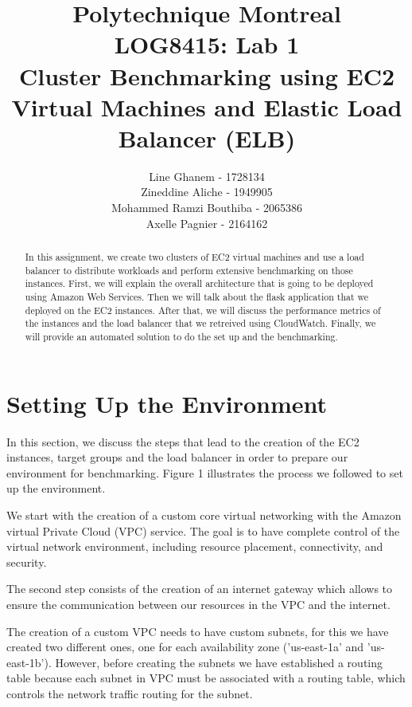 \documentclass[12pt]{article}
\title{Polytechnique Montreal \\
LOG8415: Lab 1\\
Cluster Benchmarking using EC2 Virtual
Machines and Elastic Load Balancer (ELB)}
\author{Line Ghanem - 1728134\\Zineddine Aliche - 1949905\\
Mohammed Ramzi Bouthiba - 2065386\\Axelle Pagnier - 2164162}
\begin{document}
\maketitle

\begin{abstract}
In this	assignment,	we	create	two	clusters of	EC2 virtual	machines and use	a load	balancer	to	distribute	workloads	and	perform	extensive	benchmarking	on	those instances.\newline
First, we will explain the overall architecture that is going to be deployed using Amazon Web Services. Then we will talk about the flask application that we deployed on the EC2 instances. After that, we will discuss the performance metrics of the instances and the load balancer that we retreived using CloudWatch.	Finally, we will provide an automated solution to do the set up and the benchmarking.
\end{abstract}

\section{Setting Up the Environment}

In this section, we discuss the steps that lead to the creation of the EC2 instances, target groups and the load balancer in order to prepare our environment for benchmarking. Figure 1 illustrates the process we followed to set up the environment.\vspace{1em}

We start with the creation of a custom core virtual networking with the Amazon virtual Private Cloud (VPC) service. The goal is to have complete control of the virtual network environment, including resource placement, connectivity, and security.\vspace{1em}

The second step consists of the creation of an internet gateway which allows to ensure the communication between our resources in the VPC and the internet.\vspace{1em}

The creation of a custom VPC needs to have custom subnets, for this we have created two different ones, one for each availability zone ('us-east-1a' and 'us-east-1b'). However, before creating the subnets we have established a routing table because each subnet in VPC must be associated with a routing table, which controls the network traffic routing for the subnet.\vspace{1em}
\end{document}
